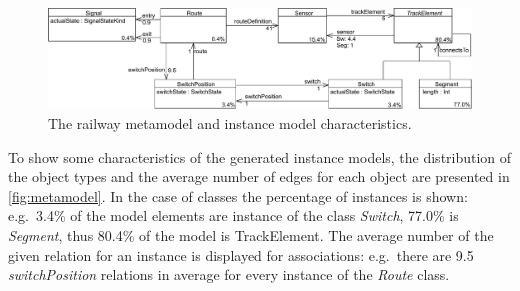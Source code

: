 \begin{figure}[Htb]
\begin{center}
\includegraphics[width=\textwidth]{figures/instance/TrainMMb.pdf}
\caption{The railway metamodel and instance model characteristics.}
\label{fig:metamodel-instance-characteristics}
\end{center}
\end{figure}

To show some characteristics of the generated instance models, the distribution of the object types and the average number of edges for each object are presented in \autoref{fig:metamodel}. In the case of classes the percentage of instances is shown: e.g.\ 3.4\% of the model elements are instance of the class \emph{Switch}, 77.0\% is \emph{Segment}, thus 80.4\% of the model is TrackElement. The average number of the given relation for an instance is displayed for associations: e.g.\ there are 9.5 \emph{switchPosition} relations in average for every instance of the \emph{Route} class.
